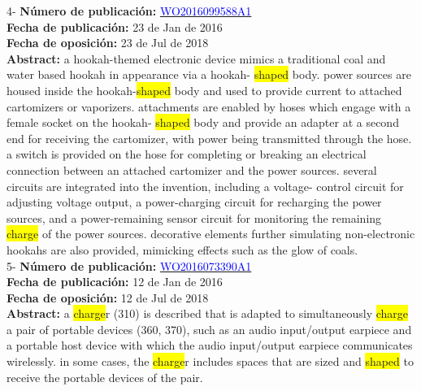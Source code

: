  \vspace{1cm}4- \textbf{Número de publicación:} \href{https://worldwide.espacenet.com/publicationDetails/biblio?DB=EPODOC&II=0&ND=3&adjacent=true&locale=en_EP&FT=D&date=20160331&CC=WO&NR=2016099588A1&KC=A1#}{\textcolor{blue}{WO2016099588A1}}\\ 
\textbf{Fecha de publicación:} 23 de Jan de 2016\\ 
\textbf{Fecha de oposición:} 23 de Jul de 2018\\ 
\textbf{Abstract:} a hookah-themed electronic device mimics a traditional coal and water based hookah in appearance via a hookah- \colorbox{yellow}{shaped} body. power sources are housed inside the hookah-\colorbox{yellow}{shaped} body and used to provide current to attached cartomizers or vaporizers. attachments are enabled by hoses which engage with a female socket on the hookah- \colorbox{yellow}{shaped} body and provide an adapter at a second end for receiving the cartomizer, with power being transmitted through the hose. a switch is provided on the hose for completing or breaking an electrical connection between an attached cartomizer and the power sources. several circuits are integrated into the invention, including a voltage- control circuit for adjusting voltage output, a power-charging circuit for recharging the power sources, and a power-remaining sensor circuit for monitoring the remaining \colorbox{yellow}{\colorbox{yellow}{charge}} of the power sources. decorative elements further simulating non-electronic hookahs are also provided, mimicking effects such as the glow of coals.\\ 
 

 \vspace{1cm}5- \textbf{Número de publicación:} \href{https://worldwide.espacenet.com/publicationDetails/biblio?DB=EPODOC&II=0&ND=3&adjacent=true&locale=en_EP&FT=D&date=20160331&CC=WO&NR=2016073390A1&KC=A1#}{\textcolor{blue}{WO2016073390A1}}\\ 
\textbf{Fecha de publicación:} 12 de Jan de 2016\\ 
\textbf{Fecha de oposición:} 12 de Jul de 2018\\ 
\textbf{Abstract:} a \colorbox{yellow}{\colorbox{yellow}{charge}}r (310) is described that is adapted to simultaneously \colorbox{yellow}{\colorbox{yellow}{charge}} a pair of portable devices (360, 370), such as an audio input/output earpiece and a portable host device with which the audio input/output earpiece communicates wirelessly. in some cases, the \colorbox{yellow}{\colorbox{yellow}{charge}}r includes spaces that are sized and \colorbox{yellow}{shaped} to receive the portable devices of the pair.\\ 
 


